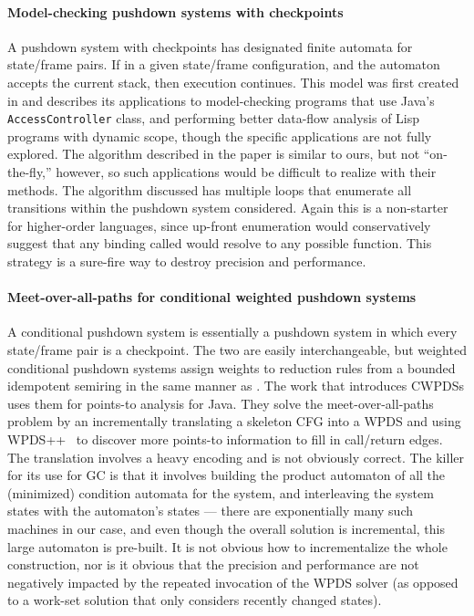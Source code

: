 \paragraph{Model-checking pushdown systems with checkpoints}
A pushdown system with checkpoints has designated finite automata for state/frame pairs.
If in a given state/frame configuration, and the automaton accepts the current stack, then execution continues.
This model was first created in \citet{EsparzaKS03} and describes its applications to model-checking programs that use Java's \texttt{AccessController} class, and performing better data-flow analysis of Lisp programs with dynamic scope, though the specific applications are not fully explored.
The algorithm described in the paper is similar to ours, but not ``on-the-fly,'' however, so such applications would be difficult to realize with their methods.
The algorithm discussed has multiple loops that enumerate all transitions within the pushdown system considered.
Again this is a non-starter for higher-order languages, since up-front enumeration would conservatively suggest that any binding called would resolve to any possible function.
This strategy is a sure-fire way to destroy precision and performance.

\paragraph{Meet-over-all-paths for conditional weighted pushdown systems}
A conditional pushdown system is essentially a pushdown system in which every state/frame pair is a checkpoint.
The two are easily interchangeable, but weighted conditional pushdown systems assign weights to reduction rules from a bounded idempotent semiring in the same manner as \citet{mattmight:Reps:2005:Weighted-PDA}.
The work that introduces CWPDSs uses them for points-to analysis for Java.
They solve the meet-over-all-paths problem by an incrementally translating a skeleton CFG into a WPDS and using WPDS++~\citep{ianjohnson:DBLP:conf/cav/LalR06} to discover more points-to information to fill in call/return edges.
The translation involves a heavy encoding and is not obviously correct.
The killer for its use for GC is that it involves building the product automaton of all the (minimized) condition automata for the system, and interleaving the system states with the automaton's states --- there are exponentially many such machines in our case, and even though the overall solution is incremental, this large automaton is pre-built.
It is not obvious how to incrementalize the whole construction, nor is it obvious that the precision and performance are not negatively impacted by the repeated invocation of the WPDS solver (as opposed to a work-set solution that only considers recently changed states).


